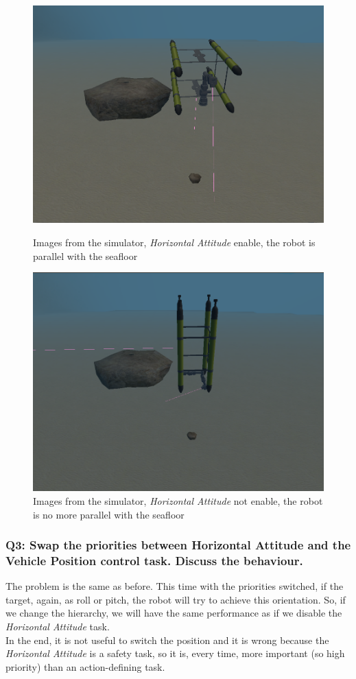 \documentclass{article}
\begin{document}
\begin{figure}[htp]
\centering
\includegraphics[width=.6\textwidth]{112_HAenabled.png}\caption{Images from the simulator, \textit{Horizontal Attitude} enable, the robot is parallel with the seafloor}
\label{fig:hae}
\vspace{5px}
\centering
\includegraphics[width=.6\textwidth]{112_HANotenabled.png}\caption{Images from the simulator, \textit{Horizontal Attitude} not enable, the robot is no more parallel with the seafloor}
\label{fig:hane}
\end{figure}

\subsubsection{Q3: Swap the priorities between Horizontal Attitude and the Vehicle Position control task. Discuss the behaviour.}
The problem is the same as before. This time with the priorities switched, if the target, again, as roll or pitch, the robot will try to achieve this orientation. 
So, if we change the hierarchy, we will have the same performance as if we disable the \textit{Horizontal Attitude} task.\\
In the end, it is not useful to switch the position and it is wrong because the \textit{Horizontal Attitude} is a safety task, so it is, every time, more important (so high priority) than an action-defining task. 
\end{document}
